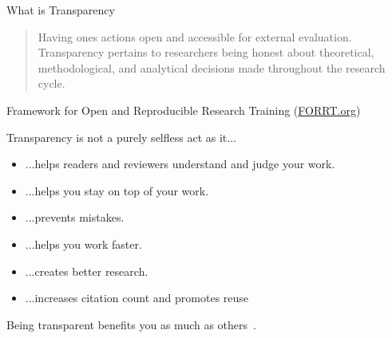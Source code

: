 
\begin{block}{What is Transparency}
   \begin{quote}
       Having one\textquotesingle s actions open and accessible for external evaluation. Transparency pertains to researchers being honest about theoretical, methodological, and analytical decisions made throughout the research cycle.\footnotemark[1]
   \end{quote} 
   Framework for Open and Reproducible Research Training (\href{https://forrt.org/glossary/transparency/}{FORRT.org})  
  
  Transparency is not a purely selfless act as it...
  \begin{itemize}
  \item ...helps readers and reviewers understand and judge your work.
  \item ...helps you stay on top of your work.
  \item ...prevents mistakes.
  \item ...helps you work faster.
  \item ...creates better research. 
  \item ...increases citation count and promotes reuse
  \end{itemize}  
  Being transparent benefits you as much as others~\footnotemark[2]. 
  


      

\end{block}
